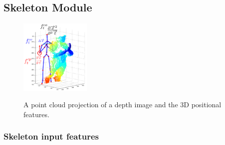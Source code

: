 %
%


\subsection{Skeleton Module}
\label{sec:skeleton_module}


\begin{figure}[t]
  \centering
  \includegraphics[width=0.3\textwidth]{images/point_cloud}\\
  \caption{
    A point cloud projection of a depth image and the 3D positional features.}
    \label{point_cloud}
\end{figure}


\subsubsection{Skeleton input features}

